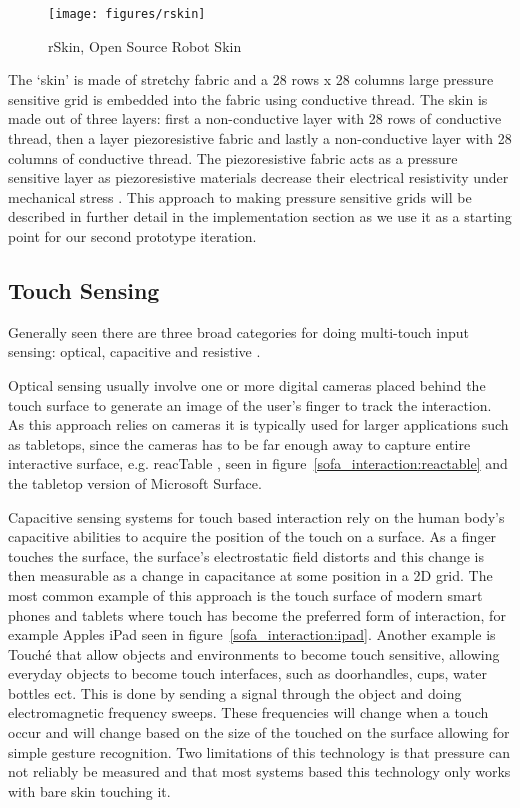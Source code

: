 \begin{figure}[h]
	\centering
  		\texttt{[image: figures/rskin]}
	\caption{rSkin, Open Source Robot Skin}
   \label{rskin}
\end{figure}
The `skin' is made of stretchy fabric and a 28 rows x 28 columns large pressure sensitive grid is embedded into the fabric using conductive thread.
The skin is made out of three layers: first a non-conductive layer with 28 rows of conductive thread, then a layer piezoresistive fabric and lastly a non-conductive layer with 28 columns of conductive thread.
The piezoresistive fabric acts as a pressure sensitive layer as piezoresistive materials decrease their electrical resistivity under mechanical stress \citep{piezoresistiveWIKIPEDIA}.
This approach to making pressure sensitive grids will be described in further detail in the implementation section as we use it as a starting point for our second prototype iteration.

\subsection{Touch Sensing}

Generally seen there are three broad categories for doing multi-touch input sensing: optical, capacitive and resistive \citep{rosenberg2009unmousepad}.

Optical sensing usually involve one or more digital cameras placed behind the touch surface to generate an image of the user's finger to track the interaction.
As this approach relies on cameras it is typically used for larger applications such as tabletops, since the cameras has to be far enough away to capture entire interactive surface, e.g. reacTable \citep{jorda2007reactable}, seen in figure~\ref{sofa_interaction:reactable} and the tabletop version of Microsoft Surface.

Capacitive sensing systems for touch based interaction rely on the human body's capacitive abilities to acquire the position of the touch on a surface. 
As a finger touches the surface, the surface's electrostatic field distorts and this change is then measurable as a change in capacitance at some position in a 2D grid.
The most common example of this approach is the touch surface of modern smart phones and tablets where touch has become the preferred form of interaction, for example Apples iPad seen in figure~\ref{sofa_interaction:ipad}.
Another example is Touch\'e \citep{sato2012touche} that allow objects and environments to become touch sensitive, allowing everyday objects to become touch interfaces, such as doorhandles, cups, water bottles ect.
This is done by sending a signal through the object and doing electromagnetic frequency sweeps. 
These frequencies will change when a touch occur and will change based on the size of the touched on the surface allowing for simple gesture recognition.
Two limitations of this technology is that pressure can not reliably be measured and that most systems based this technology only works with bare skin touching it.    

